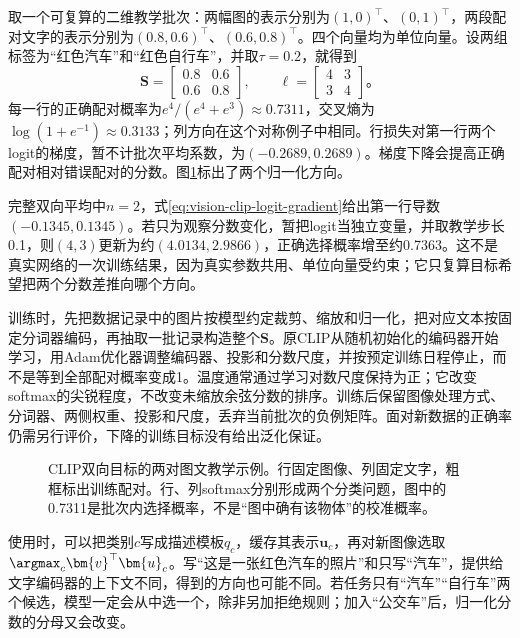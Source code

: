 取一个可复算的二维教学批次：两幅图的表示分别为$(1,0)^\top$、$(0,1)^\top$，两段配对文字的表示分别为$(0.8,0.6)^\top$、$(0.6,0.8)^\top$。四个向量均为单位向量。设两组标签为“红色汽车”和“红色自行车”，并取$\tau=0.2$，就得到
\[
  \bm{S}=\begin{bmatrix}0.8&0.6\\0.6&0.8\end{bmatrix},
  \qquad
  \bm{\ell}=\begin{bmatrix}4&3\\3&4\end{bmatrix}\text{。}
\]
每一行的正确配对概率为$e^4/(e^4+e^3)\approx0.7311$，交叉熵为$\log(1+e^{-1})\approx0.3133$；列方向在这个对称例子中相同。行损失对第一行两个logit的梯度，暂不计批次平均系数，为$(-0.2689,0.2689)$。梯度下降会提高正确配对相对错误配对的分数。图\ref{fig:vision-clip-matrix}标出了两个归一化方向。

完整双向平均中$n=2$，式\eqref{eq:vision-clip-logit-gradient}给出第一行导数$(-0.1345,0.1345)$。若只为观察分数变化，暂把logit当独立变量，并取教学步长0.1，则$(4,3)$更新为约$(4.0134,2.9866)$，正确选择概率增至约0.7363。这不是真实网络的一次训练结果，因为真实参数共用、单位向量受约束；它只复算目标希望把两个分数差推向哪个方向。

训练时，先把数据记录中的图片按模型约定裁剪、缩放和归一化，把对应文本按固定分词器编码，再抽取一批记录构造整个$\bm S$。原CLIP从随机初始化的编码器开始学习，用Adam优化器调整编码器、投影和分数尺度，并按预定训练日程停止，而不是等到全部配对概率变成1。温度通常通过学习对数尺度保持为正；它改变softmax的尖锐程度，不改变未缩放余弦分数的排序。训练后保留图像处理方式、分词器、两侧权重、投影和尺度，丢弃当前批次的负例矩阵。面对新数据的正确率仍需另行评价，下降的训练目标没有给出泛化保证。

\begin{figure}[htbp]
  \centering
  
  \caption{CLIP双向目标的两对图文教学示例。行固定图像、列固定文字，粗框标出训练配对。行、列softmax分别形成两个分类问题，图中的0.7311是批次内选择概率，不是“图中确有该物体”的校准概率。}
  \label{fig:vision-clip-matrix}
\end{figure}

使用时，可以把类别$c$写成描述模板$q_c$，缓存其表示$\bm{u}_c$，再对新图像选取$\argmax_c\bm{v}^\top\bm{u}_c$。写“这是一张红色汽车的照片”和只写“汽车”，提供给文字编码器的上下文不同，得到的方向也可能不同。若任务只有“汽车”“自行车”两个候选，模型一定会从中选一个，除非另加拒绝规则；加入“公交车”后，归一化分数的分母又会改变。

